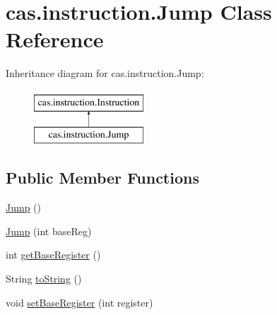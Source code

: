 \hypertarget{classcas_1_1instruction_1_1_jump}{\section{cas.\-instruction.\-Jump Class Reference}
\label{classcas_1_1instruction_1_1_jump}
}
Inheritance diagram for cas.\-instruction.\-Jump\-:\begin{figure}[H]
\begin{center}
\leavevmode
\includegraphics[height=2.000000cm]{classcas_1_1instruction_1_1_jump}
\end{center}
\end{figure}
\subsection*{Public Member Functions}
\begin{DoxyCompactItemize}
\item 
\hyperlink{classcas_1_1instruction_1_1_jump_a398865de5af8cfbd5b953c1910dacfda}{Jump} ()
\item 
\hyperlink{classcas_1_1instruction_1_1_jump_abe5311da2d382988f81d65933ff9cf44}{Jump} (int base\-Reg)
\item 
int \hyperlink{classcas_1_1instruction_1_1_jump_a8f2e48d91fb9f9cc82fdc9ac21e861dd}{get\-Base\-Register} ()
\item 
String \hyperlink{classcas_1_1instruction_1_1_jump_ab327a800e6f1817cc41e998cf555928c}{to\-String} ()
\item 
void \hyperlink{classcas_1_1instruction_1_1_jump_a699c7405303430d884232332c43b32d2}{set\-Base\-Register} (int register)
\end{DoxyCompactItemize}


